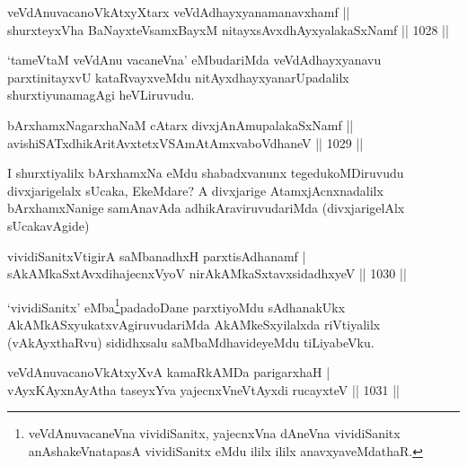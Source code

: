 
\begin{shl}
veVdAnuvacanoVkAtxyX\s tarx veVdAdhayxyanamanavxhamf || \\
shurxteyxVha BaNayxteV\s samxBayxM nitayxsAvxdhAyxyalakaSxNamf \hfill || 1028 ||  
\end{shl}

\begin{artha}
`tameVtaM veVdAnu vacaneVna' eMbudariMda veVdAdhayxyanavu parxtinitayxvU kataRvayxveMdu nitAyxdhayxyanarUpadalilx shurxtiyunamagAgi heVLiruvudu.
\end{artha}


\begin{shl}
bArxhamxNagarxhaNaM cAtarx \footnotemark[1]divxjAnAmupalakaSxNamf || \\
avishiSATxdhikAritAvxtetxVSAmAtAmxvaboVdhaneV \hfill || 1029 ||  
\end{shl}

\begin{artha}
I shurxtiyalilx bArxhamxNa eMdu shabadxvanunx tegedukoMDiruvudu divxjarigelalx sUcaka, EkeMdare? A divxjarige AtamxjAcnxnadalilx bArxhamxNanige samAnavAda adhikAraviruvudariMda (divxjarigelAlx sUcakavAgide)
\end{artha}


\begin{shl}
vividiSanitxVtigirA saMbanadhxH parxtisAdhanamf |\\
sAkAMkaSxtAvxdihajecnxVyoV nirAkAMkaSxtavxsidadhxyeV \hfill || 1030 ||
\end{shl}

\begin{artha}
`vividiSanitx' eMba\footnote{veVdAnuvacaneVna vividiSanitx, yajecnxVna dAneVna vividiSanitx anAshakeVnatapasA vividiSanitx eMdu ililx ililx anavxyaveMdathaR.}padadoDane parxtiyoMdu sAdhanakUkx AkAMkASxyukatxvAgiruvudariMda AkAMkeSxyilalxda riVtiyalilx (vAkAyxthaRvu) sididhxsalu saMbaMdhavideyeMdu tiLiyabeVku.
\end{artha}


\begin{shl}
veVdAnuvacanoVkAtxyXvA kamaRkAMDa parigarxhaH |\\
vAyxKAyxnAyAtha taseyxYva yajecnxVneVtAyxdi rucayxteV \hfill || 1031 ||
\end{shl}

